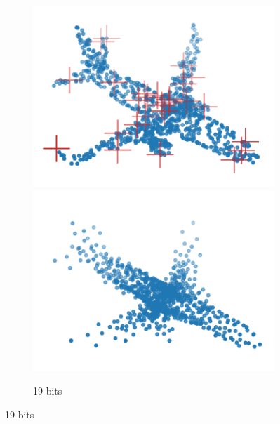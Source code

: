 \begin{figure}[t]
\begin{subfigure}[b]{\subfigureouterhspace}
\begin{subsubfigure}[b]{\subfigurehspace}
      \includegraphics[width=\linewidth]{img/point_cloud_compression/crit/test_airplane_0630/lite_2.pdf}
      \includegraphics[width=\linewidth]{img/point_cloud_compression/rec/test_airplane_0630/lite_2.pdf}
      \caption{19 bits}
      \label{fig:rec/lite/2}
    \end{subsubfigure}%
    \hfill%
    \begin{subsubfigure}[b]{\subfigurehspace}
      \centering

\end{subsubfigure}
\end{subfigure}
\end{figure}
